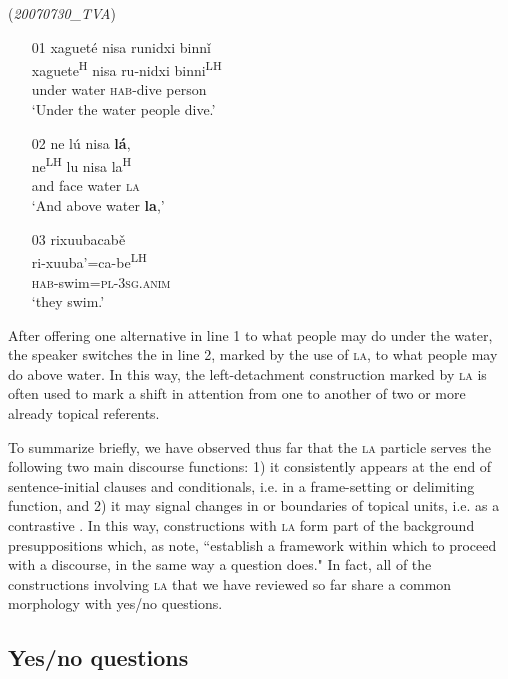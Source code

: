 \ea\label{alternatives2} (\textit{20070730{\_}TVA})
\begin{itemize}
\item[01]
\glll xaguet\'{e} nisa runidxi binn\v{i}  \\
xaguete\textsuperscript{H} nisa ru-nidxi binni\textsuperscript{LH}  \\
under water \textsc{hab}-dive person  \\
\glt `Under the water people dive.'


\item[02]
\glll ne l\'{u} nisa \textbf{l\'{a}}, \\
ne\textsuperscript{LH} lu nisa la\textsuperscript{H}  \\
and face water \textsc{la}  \\
\glt `And above water \textbf{la},'


\item[03]
\glll rixuubacab\v{e} \\
ri-xuuba'=ca-be\textsuperscript{LH}  \\
\textsc{hab}-swim=\textsc{pl}-3\textsc{sg.anim}  \\
\glt `they swim.' 

\end{itemize}
\z
After offering one alternative in line 1 to what people may do under the water, the speaker switches the  in line 2, marked by the use of \textsc{la}, to what people may do above water. In this way, the left-detachment construction marked by \textsc{la} is often used to mark a shift in attention from one to another of two or more already topical referents. 

To summarize briefly, we have observed thus far that the \textsc{la} particle serves the following two main discourse functions: 1) it consistently appears at the end of sentence-initial  clauses and conditionals, i.e. in a frame-setting or delimiting function, and 2) it may signal changes in  or boundaries of topical units, i.e. as a contrastive . In this way, constructions with \textsc{la} form part of the background presuppositions which, as \citet[292]{thompson2007} note, ``establish a framework within which to proceed with a discourse, in the same way a question does." In fact, all of the constructions involving \textsc{la} that we have reviewed so far share a common morphology with yes/no questions. 


\subsection{Yes/no questions}

